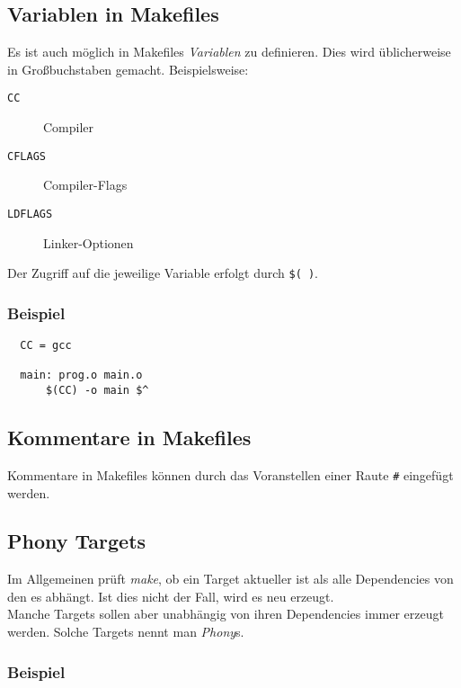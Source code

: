 \documentclass{scrartcl}
\begin{document}
\subsection{Variablen in Makefiles}
\label{sec:variablen-makefiles}
Es ist auch möglich in Makefiles \emph{Variablen} zu definieren. Dies
wird üblicherweise in Großbuchstaben gemacht. Beispielsweise:
\begin{description}
\item[\texttt{CC}] Compiler
\item[\texttt{CFLAGS}] Compiler-Flags
\item[\texttt{LDFLAGS}] Linker-Optionen
\end{description}
Der Zugriff auf die jeweilige Variable erfolgt durch \texttt{\$( )}.

\subsubsection{Beispiel}
\label{sec:beispiel-3}

\begin{lstlisting}
  CC = gcc

  main: prog.o main.o
      $(CC) -o main $^
\end{lstlisting}

\subsection{Kommentare in Makefiles}
\label{sec:kommentare-makefiles}

Kommentare in Makefiles können durch das Voranstellen einer Raute
\texttt{\#} eingefügt werden.

\subsection{Phony Targets}
\label{sec:phony-targets}

Im Allgemeinen prüft \emph{make}, ob ein Target aktueller ist als alle
Dependencies von den es abhängt. Ist dies nicht der Fall, wird es neu
erzeugt. \\
Manche Targets sollen aber unabhängig von ihren Dependencies immer
erzeugt werden. Solche Targets nennt man \emph{Phony}s.

\subsubsection{Beispiel}
\label{sec:beispiel-4}
\end{document}
